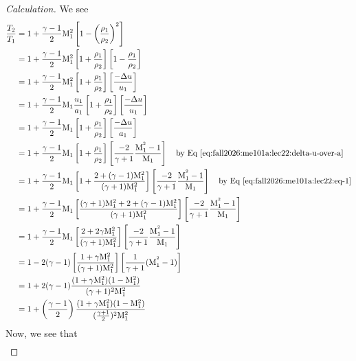 \begin{proof}[Calculation]
We see
\begin{subequations}
  \begin{align}
\frac{T_{2}}{T_{1}} &= 1+\frac{\gamma-1}{2}\mathrm{M}_{1}^{2}\left[1-\left(\frac{\rho_{1}}{\rho_{2}}\right)^{2}\right]\\
&=1+\frac{\gamma-1}{2}\mathrm{M}_{1}^{2}\left[1+\frac{\rho_{1}}{\rho_{2}}\right]\left[1-\frac{\rho_{1}}{\rho_{2}}\right]\\
&=1+\frac{\gamma-1}{2}\mathrm{M}_{1}^{2}\left[1+\frac{\rho_{1}}{\rho_{2}}\right]\left[\frac{-\Delta u}{u_{1}}\right]\\
&=1+\frac{\gamma-1}{2}\mathrm{M}_{1}\frac{u_{1}}{a_{1}}\left[1+\frac{\rho_{1}}{\rho_{2}}\right]\left[\frac{-\Delta u}{u_{1}}\right]\\
&=1+\frac{\gamma-1}{2}\mathrm{M}_{1}\left[1+\frac{\rho_{1}}{\rho_{2}}\right]\left[\frac{-\Delta u}{a_{1}}\right]\\
&=1+\frac{\gamma-1}{2}\mathrm{M}_{1}\left[1+\frac{\rho_{1}}{\rho_{2}}\right]\left[\frac{-2}{\gamma+1}\frac{\mathrm{M}_{1}^{^2}-1}{\mathrm{M}_{1}}\right]
\quad\mbox{by Eq~\eqref{eq:fall2026:me101a:lec22:delta-u-over-a}}\\
&=1+\frac{\gamma-1}{2}\mathrm{M}_{1}\left[1+\frac{2+(\gamma-1)\mathrm{M}_{1}^{2}}{(\gamma+1)\mathrm{M}_{1}^{2}}\right]\left[\frac{-2}{\gamma+1}\frac{\mathrm{M}_{1}^{^2}-1}{\mathrm{M}_{1}}\right]
\quad\mbox{by Eq~\eqref{eq:fall2026:me101a:lec22:eq-1}}\nonumber\\
&=1+\frac{\gamma-1}{2}\mathrm{M}_{1}\left[\frac{(\gamma+1)\mathrm{M}_{1}^{2}+2+(\gamma-1)\mathrm{M}_{1}^{2}}{(\gamma+1)\mathrm{M}_{1}^{2}}\right]\left[\frac{-2}{\gamma+1}\frac{\mathrm{M}_{1}^{^2}-1}{\mathrm{M}_{1}}\right]\\
&=1+\frac{\gamma-1}{2}\mathrm{M}_{1}\left[\frac{2+2\gamma\mathrm{M}_{1}^{2}}{(\gamma+1)\mathrm{M}_{1}^{2}}\right]\left[\frac{-2}{\gamma+1}\frac{\mathrm{M}_{1}^{^2}-1}{\mathrm{M}_{1}}\right]\\
&=1-2(\gamma-1)\left[\frac{1+\gamma\mathrm{M}_{1}^{2}}{(\gamma+1)\mathrm{M}_{1}^{2}}\right]\left[\frac{1}{\gamma+1}(\mathrm{M}_{1}^{^2}-1)\right]\\
&=1+2(\gamma-1)\frac{(1+\gamma\mathrm{M}_{1}^{2})(1-\mathrm{M}_{1}^{2})}{(\gamma+1)^{2}\mathrm{M}_{1}^{2}}\\
&=1+\left(\frac{\gamma-1}{2}\right)\frac{(1+\gamma\mathrm{M}_{1}^{2})(1-\mathrm{M}_{1}^{2})}{(\frac{\gamma+1}{2})^{2}\mathrm{M}_{1}^{2}}
  \end{align}
\end{subequations}
Now, we see that
\begin{subequations}
  \begin{align}

\end{align}
\end{subequations}
\end{proof}
